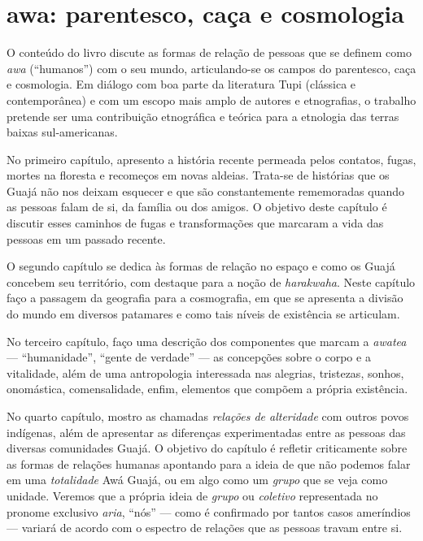 \section{awa: parentesco, caça e cosmologia}

O conteúdo do livro discute as formas de relação de pessoas que se
definem como \textit{awa} (``humanos'') com o seu mundo, articulando-se os
campos do parentesco, caça e cosmologia. Em diálogo com boa parte da
literatura Tupi (clássica e contemporânea) e com um escopo mais amplo de
autores e etnografias, o trabalho pretende ser uma contribuição
etnográfica e teórica para a etnologia das terras baixas sul-americanas.


No primeiro capítulo, apresento a história recente permeada pelos
contatos, fugas, mortes na floresta e recomeços em novas aldeias.
Trata-se de histórias que os Guajá não nos deixam esquecer e que são
constantemente rememoradas quando as pessoas falam de si, da família ou
dos amigos. O objetivo deste capítulo é discutir esses caminhos de fugas
e transformações que marcaram a vida das pessoas em um passado recente.

O segundo capítulo se dedica às formas de relação no espaço e como os
Guajá concebem seu território, com destaque para a noção de
\textit{harakwaha}. Neste capítulo faço a passagem da geografia para a
cosmografia, em que se apresenta a divisão do mundo em diversos
patamares e como tais níveis de existência se articulam.

No terceiro capítulo, faço uma descrição dos componentes que marcam a
\textit{awatea} --- ``humanidade'', ``gente de verdade'' --- as concepções sobre
o corpo e a vitalidade, além de uma antropologia interessada nas
alegrias, tristezas, sonhos, onomástica, comensalidade, enfim, elementos
que compõem a própria existência.

No quarto capítulo, mostro as chamadas \textit{relações de alteridade}
com outros povos indígenas, além de apresentar as diferenças
experimentadas entre as pessoas das diversas comunidades Guajá. O
objetivo do capítulo é refletir criticamente sobre as formas de relações
humanas apontando para a ideia de que não podemos falar em uma
\textit{totalidade} Awá Guajá, ou em algo como um \textit{grupo} que se veja
como unidade. Veremos que a própria ideia de \textit{grupo} ou
\textit{coletivo} representada no pronome exclusivo \textit{aria}, ``nós'' ---
como é confirmado por tantos casos ameríndios --- variará de acordo com o
espectro de relações que as pessoas travam entre si.

